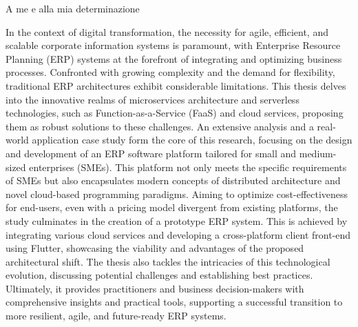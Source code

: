 \documentclass[%
	corpo=11pt,
    twoside,
    stile=classica,
    oldstyle,
    tipotesi=custom,
    greek,
    evenboxes,
]{toptesi}
\begin{document}
\english


\ifclassica%
\begin{dedica}
    A me e alla mia determinazione
\end{dedica}

\sommario%
In the context of digital transformation, the necessity for agile, efficient, and scalable corporate information systems is paramount, with Enterprise Resource Planning (ERP) systems at the forefront of integrating and optimizing business processes. Confronted with growing complexity and the demand for flexibility, traditional ERP architectures exhibit considerable limitations. This thesis delves into the innovative realms of microservices architecture and serverless technologies, such as Function-as-a-Service (FaaS) and cloud services, proposing them as robust solutions to these challenges. An extensive analysis and a real-world application case study form the core of this research, focusing on the design and development of an ERP software platform tailored for small and medium-sized enterprises (SMEs). This platform not only meets the specific requirements of SMEs but also encapsulates modern concepts of distributed architecture and novel cloud-based programming paradigms. Aiming to optimize cost-effectiveness for end-users, even with a pricing model divergent from existing platforms, the study culminates in the creation of a prototype ERP system. This is achieved by integrating various cloud services and developing a cross-platform client front-end using Flutter, showcasing the viability and advantages of the proposed architectural shift. The thesis also tackles the intricacies of this technological evolution, discussing potential challenges and establishing best practices. Ultimately, it provides practitioners and business decision-makers with comprehensive insights and practical tools, supporting a successful transition to more resilient, agile, and future-ready ERP systems.

\end{document}
